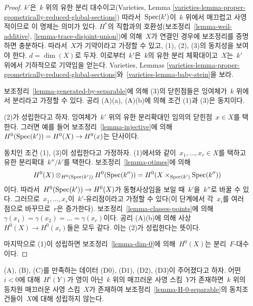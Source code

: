 \begin{proof}
$k'$은\  $k$ 위의 유한 분리 대수이고(Varieties, Lemma
\ref{varieties-lemma-proper-geometrically-reduced-global-sections})
따라서\  $\mathop{\mathrm{Spec}}(k')$이\  $k$ 위에서 매끄럽고 사영적이므로 이 명제는
의미가 있다. $H^*$의 직합과의 호환성(보조정리\ 
\ref{lemma-weil-additive}, \ref{lemma-trace-disjoint-union})에 의해\ 
$X$가 연결인 경우에 보조정리를 증명하면 충분하다. 따라서\  $X$가
기약이라고 가정할 수 있고, (1), (2), (3)의 동치성을 보여야 한다.
$d = \dim(X)$로 두자. 이로부터\  $k'$은\  $k$의 유한 분리 체확대이고\ 
$X$는\  $k'$ 위에서 기하적으로 기약임을 얻는다. Varieties, Lemmas
\ref{varieties-lemma-proper-geometrically-reduced-global-sections}와\ 
\ref{varieties-lemma-baby-stein}을 보라.

\medskip\noindent
보조정리\  \ref{lemma-generated-by-separable}에 의해 (3)의 닫힌점들은
잉여체가\  $k$ 위에서 분리라고 가정할 수 있다. 공리 (A)(a), (A)(b)에
의해 조건 (1)과 (3)은 동치이다.

\medskip\noindent
(2)가 성립한다고 하자. 잉여체가\  $k'$ 위의 유한 분리확대인 임의의
닫힌점\  $x \in X$를 택한다. 그러면 예를 들어 보조정리\ 
\ref{lemma-injective}에 의해\ 
$H^0(\mathop{\mathrm{Spec}}(k')) = H^0(X) \to H^0(x)$는 단사이다.

\medskip\noindent
동치인 조건 (1), (3)이 성립한다고 가정하자. (1)에서와 같이\ 
$x_1, \ldots, x_r \in X$를 택하고 유한 분리확대\  $k''/k'$를 택한다.
보조정리\  \ref{lemma-otimes}에 의해
$$
H^0(X) \otimes_{H^0(\mathop{\mathrm{Spec}}(k'))} H^0(\mathop{\mathrm{Spec}}(k'')) =
H^0(X \times_{\mathop{\mathrm{Spec}}(k')} \mathop{\mathrm{Spec}}(k''))
$$
이다. 따라서\  $H^0(\mathop{\mathrm{Spec}}(k')) \to H^0(X)$가 동형사상임을 보일 때\ 
$k'$을\  $k''$로 바꿀 수 있다. 그러므로\  $x_1, \ldots, x_r$이\ 
$k'$-유리점이라고 가정할 수 있다(이 단계에서 각\  $x_i$를 여러
점으로 바꾸므로\  $r$은 증가한다). 보조정리\ 
\ref{lemma-classes-points}에 의해\ 
$\gamma(x_1) = \gamma(x_2) = \ldots = \gamma(x_r)$이다.
공리 (A)(b)에 의해 사상\  $H^0(X) \to H^0(x_i)$들은 모두 같다.
이는 (2)가 성립한다는 뜻이다.

\medskip\noindent
마지막으로 (1)이 성립하면 보조정리\  \ref{lemma-dim-0}에 의해\ 
$H^0(X)$는 분리\  $F$-대수이다.
\end{proof}

\begin{lemma}
\label{lemma-negative-cohomology}
(A), (B), (C)를 만족하는 데이터 (D0), (D1), (D2), (D3)이
주어졌다고 하자. 어떤\  $i < 0$에 대해\  $H^i(Y)$가 영이 아닌\ 
$k$ 위의 매끄러운 사영 스킴\  $Y$가 존재하면\  $k$ 위의 등차원
매끄러운 사영 스킴\  $X$가 존재하여 보조정리\ 
\ref{lemma-H-0-separable}의 동치조건들이\  $X$에 대해 성립하지 않는다.
\end{lemma}

